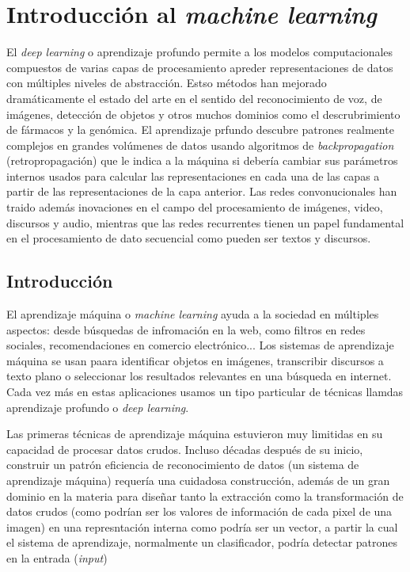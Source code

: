 \chapter{Introducción al \textit{machine learning}}

El \textit{deep learning} o aprendizaje profundo permite a los modelos computacionales compuestos de varias capas de procesamiento apreder representaciones de datos con múltiples niveles de abstracción. Estso métodos han mejorado dramáticamente el estado del arte en el sentido del reconocimiento de voz, de imágenes, detección de objetos y otros muchos dominios como el descrubrimiento de fármacos y la genómica. El aprendizaje prfundo descubre patrones realmente complejos en grandes volúmenes de datos usando algoritmos de \textit{backpropagation} (retropropagación) que le indica a la máquina si debería cambiar sus parámetros internos usados para calcular las representaciones en cada una de las capas a partir de las representaciones de la capa anterior. Las redes convonucionales han traido además inovaciones en el campo del procesamiento de imágenes, video, discursos y audio, mientras que las redes recurrentes tienen un papel fundamental en el procesamiento de dato secuencial como pueden ser textos y discursos. 


\section{Introducción}

El aprendizaje máquina o \textit{machine learning}  ayuda a la sociedad en múltiples aspectos: desde búsquedas de infromación en la web, como filtros en redes sociales, recomendaciones en comercio electrónico... Los sistemas de aprendizaje máquina se usan paara identificar objetos en imágenes, transcribir discursos a texto plano o seleccionar los resultados relevantes en una búsqueda en internet. Cada vez más en estas aplicaciones usamos un tipo particular de técnicas llamdas aprendizaje profundo o \textit{deep learning}.

Las primeras técnicas de aprendizaje máquina estuvieron muy limitidas en su capacidad de procesar datos crudos. Incluso décadas después de su inicio, construir un patrón eficiencia de reconocimiento de datos (un sistema de aprendizaje máquina) requería una cuidadosa construcción, además de un gran dominio en la materia para diseñar tanto la extracción como la transformación de datos crudos (como podrían ser los valores de información de cada pixel de una imagen) en una represntación interna como podría ser un vector, a partir la cual el sistema de aprendizaje, normalmente un clasificador, podría detectar patrones en la entrada (\textit{input})

